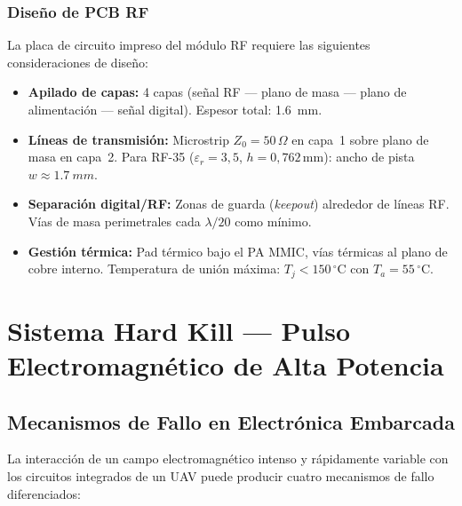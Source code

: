 \documentclass[12pt,a4paper]{article}
\begin{document}
\subsubsection{Diseño de PCB RF}

La placa de circuito impreso del módulo RF requiere las siguientes
consideraciones de diseño:

\begin{itemize}
  \item \textbf{Apilado de capas:}
        4 capas (señal RF — plano de masa — plano de alimentación — señal digital).
        Espesor total: \SI{1.6}{mm}.
  \item \textbf{Líneas de transmisión:}
        Microstrip $Z_0 = 50\,\Omega$ en capa~1 sobre plano de masa en capa~2.
        Para RF-35 ($\varepsilon_r = 3{,}5$, $h = 0{,}762$\,mm):
        ancho de pista $w \approx \SI{1.7}{mm}$.
  \item \textbf{Separación digital/RF:}
        Zonas de guarda (\textit{keepout}) alrededor de líneas RF.
        Vías de masa perimetrales cada $\lambda/20$ como mínimo.
  \item \textbf{Gestión térmica:}
        Pad térmico bajo el PA MMIC, vías térmicas al plano de cobre interno.
        Temperatura de unión máxima: $T_j < 150\,^{\circ}$C con $T_a = 55\,^{\circ}$C.
\end{itemize}

\newpage

\section{Sistema Hard Kill — Pulso Electromagnético de Alta Potencia}

\subsection{Mecanismos de Fallo en Electrónica Embarcada}

La interacción de un campo electromagnético intenso y rápidamente
variable con los circuitos integrados de un UAV puede producir
cuatro mecanismos de fallo diferenciados:
\end{document}
